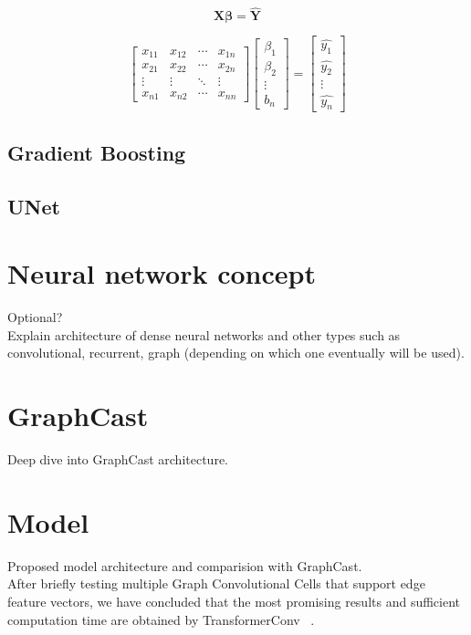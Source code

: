  \[
    \mathbf{X} \boldsymbol\beta = \mathbf{\hat{Y}}
 \]
 
 \[
    \begin{bmatrix}
    x_{11} & x_{12} & \cdots & x_{1n}\\
    x_{21} & x_{22} & \cdots & x_{2n}\\
    \vdots & \vdots & \ddots & \vdots\\
    x_{n1} & x_{n2} & \cdots & x_{nn}
    \end{bmatrix}
    \begin{bmatrix}
    \beta_1\\\beta_2\\ \vdots\\b_n
    \end{bmatrix}
    =\begin{bmatrix}
    \hat{y_1}\\\hat{y_2}\\ \vdots\\\hat{y_n}
    \end{bmatrix}
\]
 \subsection{Gradient Boosting}
 \subsection{UNet}


\section{Neural network concept}
Optional? \\

\noindent Explain architecture of dense neural networks and other types such as convolutional, recurrent, graph (depending on which one eventually will be used).

\section{GraphCast}
Deep dive into GraphCast architecture.

\section{Model}
Proposed model architecture and comparision with GraphCast. \\

\noindent After briefly testing multiple Graph Convolutional Cells that support edge feature vectors, we have concluded that the most promising results and sufficient computation time are obtained by TransformerConv ~\cite{shi2021masked}.\\

